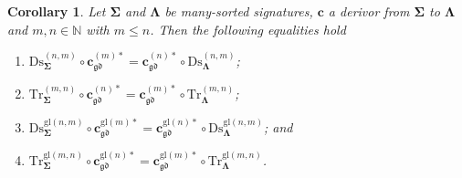 \documentclass[a4paper, reqno
]{amsart}
\newcommand{\sig}[1]{\mathbf{#1}}             %
\newcommand{\gd}{\mathfrak{gd}}              %
\newcommand{\gl}{\mathrm{gl}}                %
\newcommand{\Ds}{\mathrm{Ds}}
\newcommand{\Tr}{\mathrm{Tr}}
\theoremstyle{plain}
\newtheorem{corollary}[theorem]{Corollary}
\theoremstyle{definition}
\begin{document}
\begin{corollary}\label{CChangeSigDsTr}
Let $\sig{\Sigma}$ and $\sig{\Lambda}$ be many-sorted signatures, $\mathbf{c}$ a derivor from $\sig{\Sigma}$ to $\sig{\Lambda}$ and $m,n\in\mathbb{N}$ with $m\leq n$.
Then the following equalities hold
\begin{enumerate}
	\item
	$\Ds^{(n,m)}_{\sig{\Sigma}}\circ\mathbf{c}^{(m)\ast}_{\gd}=\mathbf{c}^{(n)\ast}_{\gd}\circ\Ds^{(n,m)}_{\sig{\Lambda}}$;

	\item
	$\Tr^{(m,n)}_{\sig{\Sigma}}\circ\mathbf{c}^{(n)\ast}_{\gd}=\mathbf{c}^{(m)\ast}_{\gd}\circ\Tr^{(m,n)}_{\sig{\Lambda}}$;

	\item
	$\Ds^{\gl(n,m)}_{\sig{\Sigma}}\circ\mathbf{c}^{\gl(m)\ast}_{\gd}=\mathbf{c}^{\gl(n)\ast}_{\gd}\circ\Ds^{\gl(n,m)}_{\sig{\Lambda}}$; and

	\item
	$\Tr^{\gl(m,n)}_{\sig{\Sigma}}\circ\mathbf{c}^{\gl(n)\ast}_{\gd}=\mathbf{c}^{\gl(m)\ast}_{\gd}\circ\Tr^{\gl(m,n)}_{\sig{\Lambda}}$.
\end{enumerate}
\end{corollary}
\end{document}
